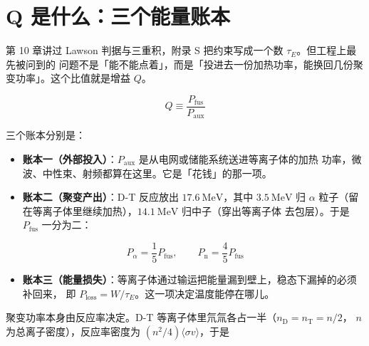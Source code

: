 
\section{Q 是什么：三个能量账本}
\label{sec:app-u-ledger}

第 10 章讲过 Lawson 判据与三重积，附录 S 把约束写成一个数 $\tau_E$。但工程上最先被问到的
问题不是「能不能点着」，而是「投进去一份加热功率，能换回几份聚变功率」。这个比值就是增益
$Q$。

\begin{equation}
Q \equiv \frac{P_{\mathrm{fus}}}{P_{\mathrm{aux}}}
\label{eq:app-u-q}
\end{equation}

三个账本分别是：

\begin{itemize}
  \item \textbf{账本一（外部投入）}：$P_{\mathrm{aux}}$ 是从电网或储能系统送进等离子体的加热
        功率，微波、中性束、射频都算在这里。它是「花钱」的那一项。
  \item \textbf{账本二（聚变产出）}：D-T 反应放出 $17.6\ \mathrm{MeV}$，其中 $3.5\ \mathrm{MeV}$
        归 $\alpha$ 粒子（留在等离子体里继续加热），$14.1\ \mathrm{MeV}$ 归中子（穿出等离子体
        去包层）。于是 $P_{\mathrm{fus}}$ 一分为二：
\end{itemize}

\begin{equation}
P_\alpha = \frac{1}{5}P_{\mathrm{fus}}, \qquad
P_{\mathrm{n}} = \frac{4}{5}P_{\mathrm{fus}}
\label{eq:app-u-split}
\end{equation}

\begin{itemize}
  \item \textbf{账本三（能量损失）}：等离子体通过输运把能量漏到壁上，稳态下漏掉的必须补回来，
        即 $P_{\mathrm{loss}} = W/\tau_E$。这一项决定温度能停在哪儿。
\end{itemize}

聚变功率本身由反应率决定。D-T 等离子体里氘氚各占一半（$n_{\mathrm D}=n_{\mathrm T}=n/2$，
$n$ 为总离子密度），反应率密度为 $(n^2/4)\langle\sigma v\rangle$，于是

